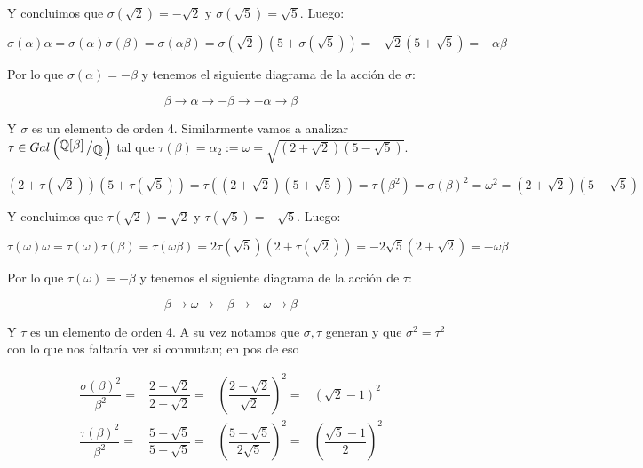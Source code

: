 \documentclass[11pt]{article}
\newcommand{\Q}{\mathbb{Q}}
\newcommand{\quotient}[2]{{\raisebox{.2em}{$#1$}\left/\raisebox{-.2em}{$#2$}\right.}}
\numberwithin{theorem}{subsection}
\begin{document}
\begin{enumerate}
\begin{itemize}
		Y concluimos que $\sigma(\sqrt{2}) = -\sqrt{2}$ y $\sigma(\sqrt{5}) = \sqrt{5}$. Luego:
		
		\begin{equation*}
			\sigma(\alpha)\alpha = \sigma(\alpha)\sigma(\beta) = \sigma(\alpha \beta) = \sigma(\sqrt{2})(5 + \sigma(\sqrt{5})) = - \sqrt{2}(5 + \sqrt{5}) = -\alpha\beta
		\end{equation*}
		
		Por lo que $\sigma(\alpha)= -\beta$	y tenemos el siguiente diagrama de la acci\'on de $\sigma$:
		
		\begin{equation*}
			\beta \rightarrow \alpha \rightarrow - \beta \rightarrow - \alpha \rightarrow \beta
		\end{equation*}
		
		Y $\sigma$ es un elemento de orden 4. Similarmente vamos a analizar $\tau\in Gal\left(\quotient{\Q[\beta]}{\Q}\right)$ tal que $\tau(\beta) = \alpha_2:= \omega = \sqrt{\left(2 + \sqrt{2}\right) \left(5 -\sqrt{5}\right)}$.
		
		\begin{equation*}
		\left(2 + \tau(\sqrt{2})\right)\left(5 + \tau(\sqrt{5})\right) = \tau\left(\left(2 + \sqrt{2}\right)\left(5 + \sqrt{5}\right)\right) = \tau(\beta^2) = \sigma(\beta)^2 = \omega^2 = \left(2 + \sqrt{2}\right) \left(5 -\sqrt{5}\right)
		\end{equation*}
		
		Y concluimos que $\tau(\sqrt{2}) = \sqrt{2}$ y $\tau(\sqrt{5}) = -\sqrt{5}$. Luego:
		
		\begin{equation*}
		\tau(\omega)\omega = \tau(\omega)\tau(\beta) = \tau(\omega\beta) = 2\tau(\sqrt{5})(2 + \tau(\sqrt{2})) = - 2\sqrt{5}(2 + \sqrt{2}) = - \omega\beta
		\end{equation*}
		
		Por lo que $\tau(\omega)= -\beta$	y tenemos el siguiente diagrama de la acci\'on de $\tau$:
		
		\begin{equation*}
		\beta \rightarrow \omega \rightarrow - \beta \rightarrow - \omega \rightarrow \beta
		\end{equation*}
		
		Y $\tau$ es un elemento de orden 4. A su vez notamos que $\sigma, \tau$ generan y que $\sigma^2 = \tau^2$ con lo que nos faltar\'ia ver si conmutan; en pos de eso
		
		\begin{equation*}
			\begin{aligned}
				\dfrac{\sigma(\beta)^2}{\beta^2} = & \dfrac{2 - \sqrt{2}}{2 + \sqrt{2}} = & \left(\dfrac{2 - \sqrt{2}}{\sqrt{2}}\right)^2 = & \left(\sqrt{2} - 1\right)^2 \\
				\dfrac{\tau(\beta)^2}{\beta^2} = & \dfrac{5 - \sqrt{5}}{5 + \sqrt{5}} = & \left(\dfrac{5 - \sqrt{5}}{2\sqrt{5}}\right)^2 = & \left(\dfrac{\sqrt{5} - 1}{2}\right)^2 \\				
			\end{aligned}
		\end{equation*}
		

\end{itemize}
\end{enumerate}
\end{document}
